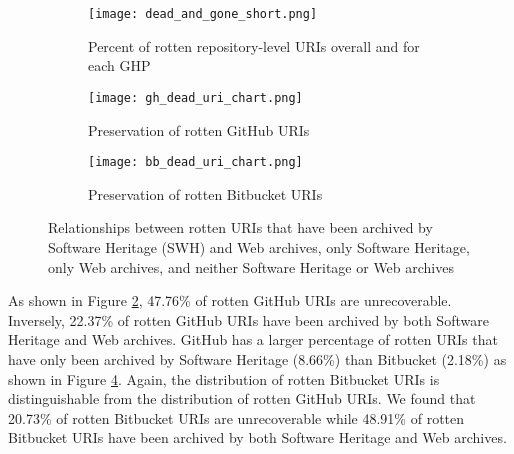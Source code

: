 \begin{figure}
\centering
\begin{subfigure}{0.8\textwidth}
    \centering
    \texttt{[image: dead\_and\_gone\_short.png]}
    \caption{Percent of rotten repository-level URIs overall and for each GHP}
    \label{fig:dead_and_gone}
\end{subfigure}
\centering
\begin{subfigure}{0.8\textwidth}
    \centering
    \texttt{[image: gh\_dead\_uri\_chart.png]}
    \caption{Preservation of rotten GitHub URIs}
    \label{fig:gh_dead_sankey}
\end{subfigure}
\begin{subfigure}{0.8\textwidth}
    \centering
    \texttt{[image: bb\_dead\_uri\_chart.png]}
    \caption{Preservation of rotten Bitbucket URIs}
    \label{fig:bb_dead_sankey}
\end{subfigure}
\caption{Relationships between rotten URIs that have been archived by Software Heritage (SWH) and Web archives, only Software Heritage, only Web archives, and neither Software Heritage or Web archives}
\end{figure}

As shown in Figure \ref{fig:gh_dead_sankey}, 47.76\% of rotten GitHub URIs are unrecoverable. Inversely, 22.37\% of rotten GitHub URIs have been archived by both Software Heritage and Web archives. GitHub has a larger percentage of rotten URIs that have only been archived by Software Heritage (8.66\%) than Bitbucket (2.18\%) as shown in Figure \ref{fig:bb_dead_sankey}. Again, the distribution of rotten Bitbucket URIs is distinguishable from the distribution of rotten GitHub URIs. We found that 20.73\% of rotten Bitbucket URIs are unrecoverable while 48.91\% of rotten Bitbucket URIs have been archived by both Software Heritage and Web archives.  